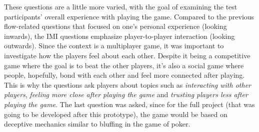 These questions are a little more varied, with the goal of examining the test participants' overall experience with playing the game. Compared to the previous flow-related questions that focused on one's personal experience (looking inwards), the IMI questions emphasize player-to-player interaction (looking outwards). Since the context is a multiplayer game, it was important to investigate how the players feel about each other. Despite it being a competitive game where the goal is to beat the other players, it's also a social game where people, hopefully, bond with each other and feel more connected after playing. This is why the questions ask players about topics such as \textit{interacting with other players}, \textit{feeling more close after playing the game} and \textit{trusting players less after playing the game}. The last question was asked, since for the full project (that was going to be developed after this prototype), the game would be based on deceptive mechanics similar to bluffing in the game of poker.